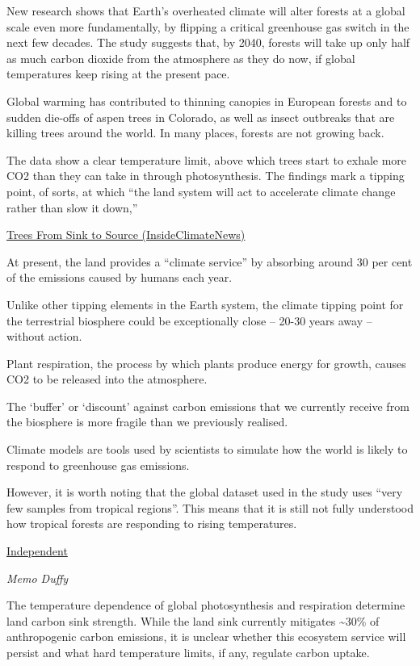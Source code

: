 \documentclass[
]{book}
\begin{document}
New research shows that Earth's overheated climate will
alter forests at a global scale even more fundamentally,
by flipping a critical greenhouse gas switch in the next few decades.
The study suggests that, by 2040, forests will take up only
half as much carbon dioxide from the atmosphere as they do now,
if global temperatures keep rising at the present pace.

Global warming has contributed to thinning canopies in European forests
and to sudden die-offs of aspen trees in Colorado,
as well as insect outbreaks that are killing trees around the world.
In many places, forests are not growing back.

The data show a clear temperature limit,
above which trees start to exhale more CO2 than they can take in through photosynthesis.
The findings mark a tipping point, of sorts, at which ``the land system will act to accelerate climate change rather than slow it down,''

\href{https://insideclimatenews.org/news/13012021/forests-heat-climate-change/}{Trees From Sink to Source (InsideClimateNews)}

At present, the land provides a ``climate service'' by absorbing
around 30 per cent of the emissions caused by humans each year.

Unlike other tipping elements in the Earth system, the climate tipping point
for the terrestrial biosphere could be exceptionally close --
20-30 years away -- without action.

Plant respiration, the process by which plants produce energy for growth,
causes CO2 to be released into the atmosphere.

The `buffer' or `discount' against carbon emissions that we currently receive from the biosphere is more fragile than we previously realised.

Climate models are tools used by scientists to simulate how the world is likely to respond to greenhouse gas emissions.

However, it is worth noting that the global dataset used in the study
uses ``very few samples from tropical regions''.
This means that it is still not fully understood how tropical forests
are responding to rising temperatures.

\href{https://www.independent.co.uk/environment/climate-change/land-ecosystems-tipping-point-temperature-b1786822.html}{Independent}

\emph{Memo Duffy}

The temperature dependence of global photosynthesis and respiration
determine land carbon sink strength.
While the land sink currently mitigates \textasciitilde30\% of anthropogenic carbon emissions,
it is unclear whether this ecosystem service will persist and
what hard temperature limits, if any, regulate carbon uptake.
\end{document}

